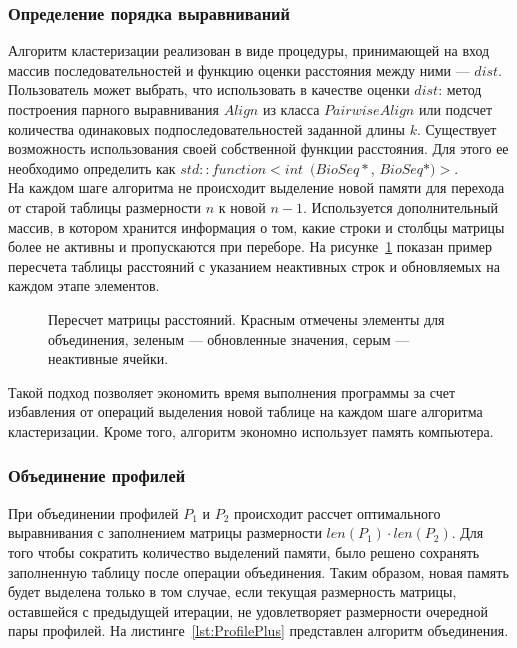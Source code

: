\subsubsection[Определение порядка выравниваний]{\large Определение порядка выравниваний}
\hspace{\parindent} Алгоритм кластеризации реализован в виде процедуры, принимающей на вход массив последовательностей и функцию оценки расстояния между ними --- $dist$. Пользователь может выбрать, что использовать в качестве оценки $dist$: метод построения парного выравнивания $Align$ из класса $PairwiseAlign$ или подсчет количества одинаковых подпоследовательностей заданной длины $k$. Существует возможность использования своей собственной функции расстояния. Для этого ее необходимо определить как $std::function<int$~$(BioSeq*$, $BioSeq*)>$. \\
\indent На каждом шаге алгоритма не происходит выделение новой памяти для перехода от старой таблицы размерности $n$ к новой $n-1$. Используется дополнительный массив, в котором хранится информация о том, какие строки и столбцы матрицы более не активны и пропускаются при переборе. На рисунке~\ref{ris:UPGMA-2} показан пример пересчета таблицы расстояний с указанием неактивных строк и  обновляемых на каждом этапе элементов. 

\begin{figure}[h]
	\caption{Пересчет матрицы расстояний. Красным отмечены элементы для объединения, зеленым --- обновленные значения, серым --- неактивные ячейки.}
	\label{ris:UPGMA-2}
\end{figure}

Такой подход позволяет экономить время выполнения программы за счет избавления от операций выделения новой таблице на каждом шаге алгоритма кластеризации. Кроме того, алгоритм экономно использует память компьютера.

\subsubsection[Объединение профилей]{\large Объединение профилей}
\hspace{\parindent} При объединении профилей $P_1$ и $P_2$ происходит рассчет оптимального выравнивания с заполнением матрицы размерности $len(P_1) \cdot len(P_2)$. Для того чтобы сократить количество выделений памяти, было решено сохранять заполненную таблицу после операции объединения. Таким образом, новая память будет выделена только в том случае, если текущая размерность матрицы, оставшейся с предыдущей итерации, не удовлетворяет размерности очередной пары профилей. На листинге~\ref{lst:ProfilePlus} представлен алгоритм объединения.


